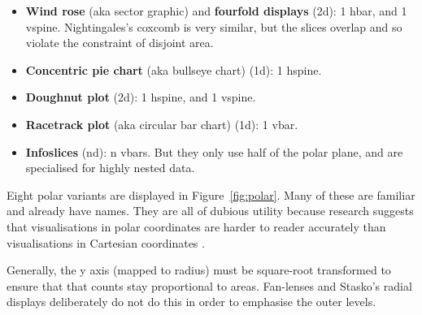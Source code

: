 \documentclass[journal]{vgtc}
\begin{document}
\begin{itemize}
  \setlength{\itemsep}{0em}
  
  \item {\bf Wind rose} (aka sector graphic) \citep{lalanne:1843} and {\bf fourfold displays} \citep{friendly:1995} (2d): 1 hbar, and 1 vspine. Nightingales's coxcomb \citep{nightingale:1857} is very similar, but the slices overlap and so violate the constraint of disjoint area.

  \item {\bf Concentric pie chart} (aka bullseye chart) (1d): 1 hspine.

  \item {\bf Doughnut plot} (2d): 1 hspine, and 1 vspine.

  \item {\bf Racetrack plot} (aka circular bar chart) (1d): 1 vbar.

  \item {\bf Infoslices} \citep{andrews:1998} (nd): n vbars. But they only use half of the polar plane, and are specialised for highly nested data.

\end{itemize}

\noindent Eight polar variants are displayed in Figure~\ref{fig:polar}. Many of these are familiar and already have names. They are all of dubious utility because research suggests that visualisations in polar coordinates are harder to reader accurately than visualisations in Cartesian coordinates \citep{diehl:2010}.

Generally, the y axis (mapped to radius) must be square-root transformed to ensure that that counts stay proportional to areas. Fan-lenses \citep{lou:2007} and Stasko's radial displays \citep{stasko:2000} deliberately do not do this in order to emphasise the outer levels.
\end{document}

